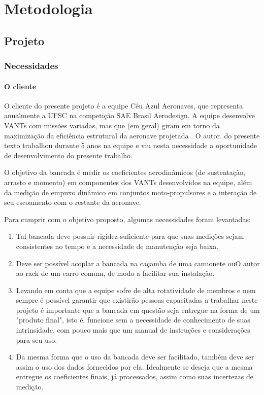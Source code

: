 \chapter{Metodologia}\label{chp:met}

\section{Projeto}

\subsection{Necessidades}

\subsubsection{O cliente}
O cliente do presente projeto é a equipe Céu Azul Aeronaves, que representa anualmente a UFSC na competição SAE Brasil Aerodesign. A equipe desenvolve VANTs com missões variadas, mas que (em geral) giram em torno da maximização da eficiência estrutural da aeronave projetada \citep{brasil2018sae}. O autor. do presente texto trabalhou durante 5 anos na equipe e viu nesta necessidade a oportunidade de desenvolvimento do presente trabalho.

O objetivo da bancada é medir os coeficientes aerodinâmicos (de sustentação, arrasto e momento) em componentes dos VANTs desenvolvidos na equipe, além da medição de empuxo dinâmico em conjuntos moto-propulsores e a interação de seu escoamento com o restante da aeronave.

Para cumprir com o objetivo proposto, algumas necessidades foram levantadas:

\begin{enumerate}
    \item Tal bancada deve possuir rigidez suficiente para que suas medições sejam consistentes no tempo e a necessidade de manutenção seja baixa.
    \item Deve ser possível acoplar a bancada na caçamba de uma camionete ouO autor ao rack de um carro comum, de modo a facilitar sua instalação.
    \item Levando em conta que a equipe sofre de alta rotatividade de membros e nem sempre é possível garantir que existirão pessoas capacitadas a trabalhar neste projeto é importante que a bancada em questão seja entregue na forma de um "produto final", isto é, funcione sem a necessidade de conhecimento de suas intrinsidade, com pouco mais que um manual de instruções e considerações para seu uso.
    \item Da mesma forma que o uso da bancada deve ser facilitado, também deve ser assim o uso dos dados fornecidos por ela. Idealmente se deseja que a mesma entregue os coeficientes finais, já processados, assim como suas incertezas de medição.
\end{enumerate}

